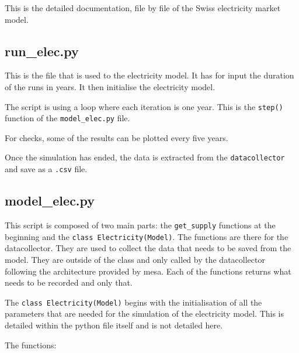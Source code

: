 
\label{sec:}

This is the detailed documentation, file by file of the Swiss electricity market model.

\subsection{run\_elec.py}

This is the file that is used to the electricity model. It has for input the duration of the runs in years. It then initialise the electricity model.

The script is using a loop where each iteration is one year. This is the \texttt{step()} function of the \texttt{model\_elec.py} file.

For checks, some of the results can be plotted every five years.

Once the simulation has ended, the data is extracted from the \texttt{datacollector} and save as a \texttt{.csv} file.



\subsection{model\_elec.py}

This script is composed of two main parts: the \texttt{get\_supply} functions at the beginning and the \texttt{class Electricity(Model)}. The functions are there for the datacollector. They are used to collect the data that needs to be saved from the model. They are outside of the class and only called by the datacollector following the architecture provided by mesa. Each of the functions returns what needs to be recorded and only that.

The \texttt{class Electricity(Model)} begins with the initialisation of all the parameters that are needed for the simulation of the electricity model. This is detailed within the python file itself and is not detailed here.

The functions:

